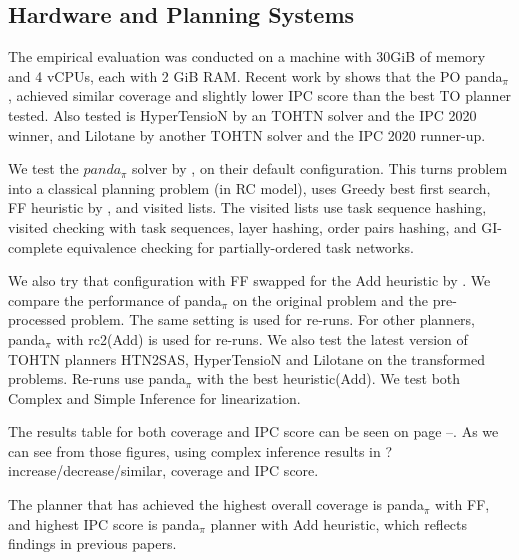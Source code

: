 \documentclass[letterpaper]{article} %
\begin{document}
\subsection{Hardware and Planning Systems}
The empirical evaluation was conducted on a machine with 30GiB of memory and 4 vCPUs, each with 2 GiB RAM. Recent work by \cite{HTN2SAS} shows that the PO panda$_\pi$, achieved similar coverage and slightly lower IPC score than the best TO planner tested. Also tested is HyperTensioN by \cite{hypertension} an TOHTN solver and the IPC 2020 winner, and Lilotane by \cite{Lilotane} another TOHTN solver and the IPC 2020 runner-up. 

We test the $panda_{\pi}$ solver by \cite{useClassicalHuristicICAPS18,useClassicalHeuristicIJCAI19,progressionsearchJAIR20}, on their default configuration. This turns problem into a classical planning problem (in RC model), uses Greedy best first search, FF heuristic by \cite{FF}, and visited lists. The visited lists use task sequence hashing, visited checking with task sequences, layer hashing, order pairs hashing, and GI-complete equivalence checking for partially-ordered task networks.



We also try that configuration with FF swapped for the Add heuristic by \cite{Add}.
We compare the performance of panda$_\pi$ on the original problem and the pre-processed problem. The same setting is used for re-runs. For other planners, panda$_\pi$ with rc2(Add) is used for re-runs. We also test the latest version of TOHTN planners HTN2SAS, HyperTensioN and Lilotane on the transformed problems. Re-runs use panda$_{\pi}$ with the best heuristic(Add). 
We test both Complex and Simple Inference for linearization.

The results table for both coverage and IPC score can be seen on page \pageref{table:GroundedSimpleIPC}--\pageref{table:GroundedComplexIPC}.
As we can see from those figures, using complex inference results in ?  increase/decrease/similar, coverage and IPC score.

The planner that has achieved the highest overall coverage is panda$_\pi$ with FF, and highest IPC score is panda$_\pi$ planner with Add heuristic, which reflects findings in previous papers.
\end{document}
